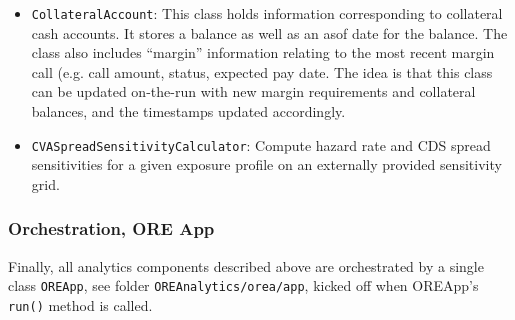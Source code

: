 \documentclass[12pt, a4paper]{report}
\begin{document}
\begin{itemize}
\item {\tt CollateralAccount}: This class holds information corresponding to collateral cash accounts. It stores a balance as well as an asof date for the balance. The class also includes ``margin'' information relating to the most recent margin call (e.g. call amount, status, expected pay date. The idea is that this class can be updated on-the-run with new margin requirements and collateral balances, and the timestamps updated accordingly.
\item {\tt CVASpreadSensitivityCalculator}: Compute hazard rate and CDS spread sensitivities for a given exposure profile on an externally provided sensitivity grid.
\end{itemize}

\subsubsection{Orchestration, ORE App}

Finally, all analytics components described above are orchestrated by a single class {\tt OREApp},
see folder {\tt OREAnalytics/orea/app}, kicked off when OREApp's {\tt run()} method is called.
\end{document}
